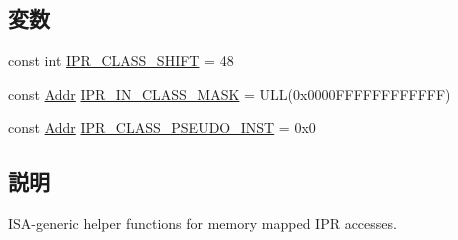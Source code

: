 \subsection*{変数}
\begin{Indent}{\bf }\par
{\em \label{_amgrpd41d8cd98f00b204e9800998ecf8427e}
 }\begin{DoxyCompactItemize}
\item 
const int \hyperlink{namespaceGenericISA_aeb17d164394fbbccc6ef6992f36e9a74}{IPR\_\-CLASS\_\-SHIFT} = 48
\item 
const \hyperlink{base_2types_8hh_af1bb03d6a4ee096394a6749f0a169232}{Addr} \hyperlink{namespaceGenericISA_ada17fbe3666ca6de3621618e5abf7791}{IPR\_\-IN\_\-CLASS\_\-MASK} = ULL(0x0000FFFFFFFFFFFF)
\item 
const \hyperlink{base_2types_8hh_af1bb03d6a4ee096394a6749f0a169232}{Addr} \hyperlink{namespaceGenericISA_a7691200ba0d3fea3d1bfdc555efb9b76}{IPR\_\-CLASS\_\-PSEUDO\_\-INST} = 0x0
\end{DoxyCompactItemize}
\end{Indent}


\subsection{説明}
ISA-\/generic helper functions for memory mapped IPR accesses. 